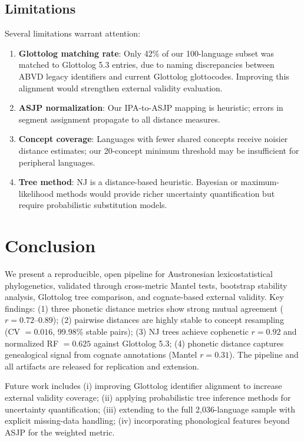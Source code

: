 \documentclass[manuscript]{clv2025}
\begin{document}
\subsection{Limitations}

Several limitations warrant attention:
\begin{enumerate}
  \item \textbf{Glottolog matching rate}: Only 42\% of our 100-language subset was matched to Glottolog 5.3 entries, due to naming discrepancies between ABVD legacy identifiers and current Glottolog glottocodes. Improving this alignment would strengthen external validity evaluation.
  \item \textbf{ASJP normalization}: Our IPA-to-ASJP mapping is heuristic; errors in segment assignment propagate to all distance measures.
  \item \textbf{Concept coverage}: Languages with fewer shared concepts receive noisier distance estimates; our 20-concept minimum threshold may be insufficient for peripheral languages.
  \item \textbf{Tree method}: NJ is a distance-based heuristic. Bayesian or maximum-likelihood methods \cite{felsenstein2004inferring} would provide richer uncertainty quantification but require probabilistic substitution models.
\end{enumerate}

\section{Conclusion}
\label{sec:conclusion}

We present a reproducible, open pipeline for Austronesian lexicostatistical phylogenetics, validated through cross-metric Mantel tests, bootstrap stability analysis, Glottolog tree comparison, and cognate-based external validity. Key findings: (1) three phonetic distance metrics show strong mutual agreement ($r = 0.72$--$0.89$); (2) pairwise distances are highly stable to concept resampling (CV $= 0.016$, 99.98\% stable pairs); (3) NJ trees achieve cophenetic $r = 0.92$ and normalized RF $= 0.625$ against Glottolog 5.3; (4) phonetic distance captures genealogical signal from cognate annotations (Mantel $r = 0.31$). The pipeline and all artifacts are released for replication and extension.

Future work includes (i) improving Glottolog identifier alignment to increase external validity coverage; (ii) applying probabilistic tree inference methods for uncertainty quantification; (iii) extending to the full 2{,}036-language sample with explicit missing-data handling; (iv) incorporating phonological features beyond ASJP for the weighted metric.



\end{document}
